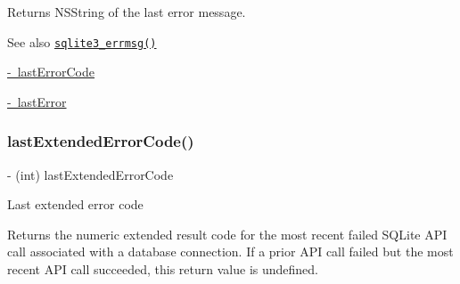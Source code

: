 \begin{DoxyReturn}{Returns}
{\ttfamily N\+S\+String} of the last error message.
\end{DoxyReturn}
\begin{DoxySeeAlso}{See also}
\href{http://sqlite.org/c3ref/errcode.html}{\tt sqlite3\+\_\+errmsg()} 

\mbox{\hyperlink{interface_o_p_t_l_y_f_m_d_b_database_a9f15cf87d3c764783ce0c6beb39393a9}{-\/ last\+Error\+Code}} 

\mbox{\hyperlink{interface_o_p_t_l_y_f_m_d_b_database_a477a6ff4d9daaac53a56c0a058a0d2f7}{-\/ last\+Error}} 
\end{DoxySeeAlso}
\mbox{\label{interface_o_p_t_l_y_f_m_d_b_database_a1f6aef053fa570de3c6c3d1e8bc34989}} 
\subsubsection{\texorpdfstring{last\+Extended\+Error\+Code()}{lastExtendedErrorCode()}}
{\footnotesize\ttfamily -\/ (int) last\+Extended\+Error\+Code \begin{DoxyParamCaption}{ }\end{DoxyParamCaption}}

Last extended error code

Returns the numeric extended result code for the most recent failed S\+Q\+Lite A\+PI call associated with a database connection. If a prior A\+PI call failed but the most recent A\+PI call succeeded, this return value is undefined.

